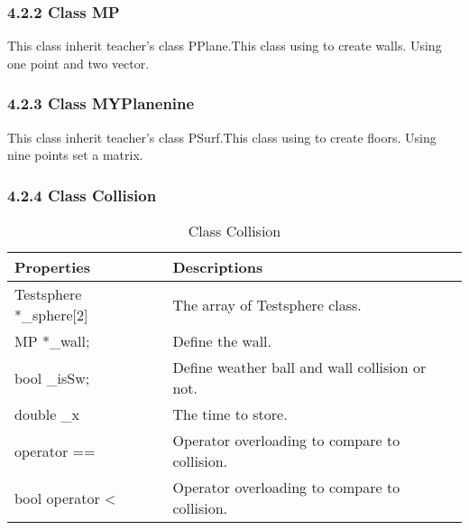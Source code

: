 \documentclass[a4,10pt]{article}
\begin{document}
\subsubsection*{4.2.2 Class MP}
This class inherit teacher's class PPlane.This class using to create walls.
Using one point and two vector.

\subsubsection*{4.2.3 Class MYPlanenine}
This class inherit teacher's class PSurf.This class using to create floors.
Using nine points set a matrix.

\subsubsection*{4.2.4 Class Collision}

\begin{table}[H]
\centering
\caption{Class Collision}
\label{my-label}
\begin{tabular}{|l|l|}
\hline
\textbf{Properties}         & \textbf{Descriptions}                          \\ \hline
Testsphere *\_sphere{[}2{] }            & The array of Testsphere class.                 \\ \hline
MP *\_wall;                 & Define the wall.                               \\ \hline
bool \_isSw;                & Define weather ball and wall collision or not. \\ \hline
double \_x                  & The time to store.                             \\ \hline
operator ==                 & Operator overloading to compare to collision.  \\ \hline
bool operator \textless     & Operator overloading to compare to collision.  \\ \hline
\end{tabular}
\end{table}
\end{document}
